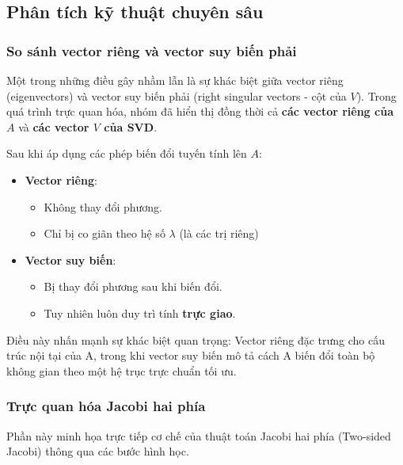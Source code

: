 \subsection{Phân tích kỹ thuật chuyên sâu}

\subsubsection{So sánh vector riêng và vector suy biến phải}

Một trong những điều gây nhầm lẫn là sự khác biệt giữa vector riêng (eigenvectors) và vector suy biến phải (right singular vectors - cột của $V$). Trong quá trình trực quan hóa, nhóm đã hiển thị đồng thời cả \textbf{các vector riêng của $A$} và \textbf{các vector $V$ của SVD}.

Sau khi áp dụng các phép biến đổi tuyến tính lên $A$:

\begin{itemize}[topsep=0pt, itemsep=2.5pt, leftmargin=1.5cm]
    \item \textbf{Vector riêng}:
    \begin{itemize}[label=, leftmargin=1.5cm]
        \item Không thay đổi phương.
        \item Chỉ bị co giãn theo hệ số $\lambda$ (là các trị riêng)     
    \end{itemize}

    \item \textbf{Vector suy biến}:
    \begin{itemize}[label=, leftmargin=1.5cm]
        \item Bị thay đổi phương sau khi biến đổi.
        \item Tuy nhiên luôn duy trì tính \textbf{trực giao}.    
    \end{itemize}
\end{itemize}

Điều này nhấn mạnh sự khác biệt quan trọng: Vector riêng đặc trưng cho cấu trúc nội tại của A, trong khi vector suy biến mô tả cách A biến đổi toàn bộ không gian theo một hệ trục trực chuẩn tối ưu.

\subsubsection{Trực quan hóa Jacobi hai phía}

Phần này minh họa trực tiếp cơ chế của thuật toán Jacobi hai phía (Two-sided Jacobi) thông qua các bước hình học.

